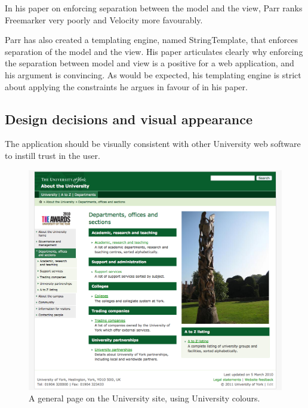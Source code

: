 \documentclass[draft]{scrartcl}
\begin{document}
In his paper on enforcing separation between the model and the view, Parr
\cite{Parr2004templateengines} ranks Freemarker very poorly and Velocity more
favourably.


Parr has also created a templating engine, named StringTemplate, that enforces
separation of the model and the view. His paper articulates clearly why
enforcing the separation between model and view is a positive for a web
application, and his argument is convincing. As would be expected, his
templating engine is strict about applying the constraints he argues in favour
of in his paper.



\subsection{Design decisions and visual appearance}

The application should be visually consistent with other University web
software to instill trust in the user.

\begin{figure}
  \begin{center}
    \includegraphics[width=160mm]{images/2011_11_06_yorkacuk.png}
  \end{center}
  \caption{A general page on the University site, using University colours.}
  \label{yorkacuk_general_page}
\end{figure}
\end{document}
